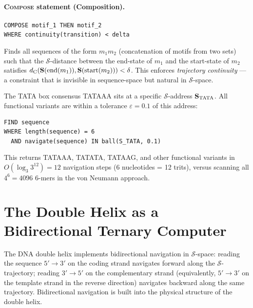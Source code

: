 \paragraph{\textsc{Compose} statement (Composition).}
\begin{verbatim}
COMPOSE motif_1 THEN motif_2
WHERE continuity(transition) < delta
\end{verbatim}
Finds all sequences of the form $m_1 m_2$ (concatenation of motifs from
two sets) such that the $\mathcal{S}$-distance between the end-state of
$m_1$ and the start-state of $m_2$ satisfies $d_{\mathrm{C}}(\mathbf{S}(\mathrm{end}(m_1)),
\mathbf{S}(\mathrm{start}(m_2))) < \delta$. This enforces \emph{trajectory
continuity} --- a constraint that is invisible in sequence-space but
natural in $\mathcal{S}$-space.

\begin{example}
\label{ex:psl_tata}
The TATA box consensus TATAAA sits at a specific $\mathcal{S}$-address
$\mathbf{S}_{\mathrm{TATA}}$. All functional variants are within a tolerance
$\varepsilon = 0.1$ of this address:
\begin{verbatim}
FIND sequence
WHERE length(sequence) = 6
  AND navigate(sequence) IN ball(S_TATA, 0.1)
\end{verbatim}
This returns TATAAA, TATATA, TATAAG, and other functional variants in
$O(\log_3 3^{12}) = 12$ navigation steps (6 nucleotides = 12 trits),
versus scanning all $4^6 = 4096$ 6-mers in the von Neumann approach.
\end{example}

\section{The Double Helix as a Bidirectional Ternary Computer}
\label{sec:bidirectional}

\begin{theorem}
\label{thm:bidirectional}
The DNA double helix implements bidirectional navigation in $\mathcal{S}$-space:
reading the sequence $5' \to 3'$ on the coding strand navigates forward
along the $\mathcal{S}$-trajectory; reading $3' \to 5'$ on the
complementary strand (equivalently, $5' \to 3'$ on the template strand
in the reverse direction) navigates backward along the same trajectory.
Bidirectional navigation is built into the physical structure of the
double helix.
\end{theorem}

